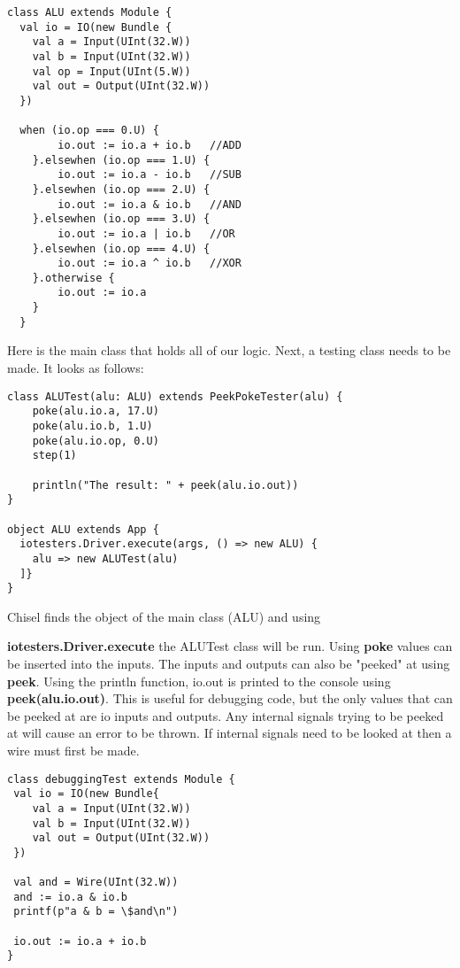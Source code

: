 \documentclass[12pt, letterpaper]{report}
\begin{document}
\begin{lstlisting}[style=scala]
class ALU extends Module {
  val io = IO(new Bundle {
    val a = Input(UInt(32.W))
    val b = Input(UInt(32.W))
    val op = Input(UInt(5.W))
    val out = Output(UInt(32.W))
  })

  when (io.op === 0.U) {
        io.out := io.a + io.b   //ADD
    }.elsewhen (io.op === 1.U) {
        io.out := io.a - io.b   //SUB
    }.elsewhen (io.op === 2.U) {
        io.out := io.a & io.b   //AND
    }.elsewhen (io.op === 3.U) {
        io.out := io.a | io.b   //OR
    }.elsewhen (io.op === 4.U) {
        io.out := io.a ^ io.b   //XOR
    }.otherwise {
        io.out := io.a
    }
  }
\end{lstlisting}

Here is the main class that holds all of our logic. Next, a testing class needs to be made. It looks as follows:

\begin{lstlisting}[style=scala]
 class ALUTest(alu: ALU) extends PeekPokeTester(alu) {
    poke(alu.io.a, 17.U)
    poke(alu.io.b, 1.U)
    poke(alu.io.op, 0.U)
    step(1)

    println("The result: " + peek(alu.io.out))
}

object ALU extends App {
  iotesters.Driver.execute(args, () => new ALU) {
    alu => new ALUTest(alu)
  ]}
}
\end{lstlisting}

Chisel finds the object of the main class (ALU) and using 

\textbf{iotesters.Driver.execute} the ALUTest class will be run.
Using \textbf{poke} values can be inserted into the inputs. The inputs and outputs can also be "peeked" at using \textbf{peek}.
Using the println function, io.out is printed to the console using \textbf{peek(alu.io.out)}. 
This is useful for debugging code, but the only values that can be peeked at are io inputs and outputs. 
Any internal signals trying to be peeked at will cause an error to be thrown. If internal signals need to 
be looked at then a wire must first be made.

\begin{lstlisting}[style=scala]
class debuggingTest extends Module {
 val io = IO(new Bundle{
    val a = Input(UInt(32.W))
    val b = Input(UInt(32.W))
    val out = Output(UInt(32.W))
 })

 val and = Wire(UInt(32.W))
 and := io.a & io.b
 printf(p"a & b = \$and\n")

 io.out := io.a + io.b
}
\end{lstlisting}
\end{document}
